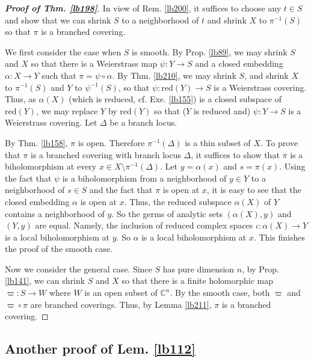 \documentclass[12pt,b5paper,notitlepage]{report}
\theoremstyle{definition}
\theoremstyle{plain}
\newcommand{\Cbb}{\mathbb C}
\newcommand{\red}{\mathrm{red}}
\numberwithin{equation}{section}
\begin{document}
\begin{proof}[\textbf{Proof of Thm. \ref{lb198}}]
In view of Rem. \ref{lb200}, it suffices to choose any $t\in S$ and show that we can shrink $S$ to a neighborhood of $t$ and shrink $X$ to $\pi^{-1}(S)$ so that $\pi$ is a branched covering. 

We first consider the case when $S$ is smooth. By Prop. \ref{lb89}, we may shrink $S$ and $X$ so that there is a Weierstrass map $\psi:Y\rightarrow S$ and a closed embedding $\alpha:X\rightarrow Y$ such that $\pi=\psi\circ\alpha$. By Thm. \ref{lb210}, we may shrink $S$, and shrink $X$ to $\pi^{-1}(S)$ and $Y$ to $\psi^{-1}(S)$, so that $\psi:\red(Y)\rightarrow S$ is a Weierstrass covering. Thus, as $\alpha(X)$ (which is reduced, cf. Exe. \ref{lb155}) is a closed subspace of $\red(Y)$, we may replace $Y$ by $\red(Y)$ so that ($Y$ is reduced and) $\psi:Y\rightarrow S$ is a Weierstrass covering. Let $\Delta$ be a branch locus.

By Thm. \ref{lb158}, $\pi$ is open. Therefore $\pi^{-1}(\Delta)$ is a thin subset of $X$. To prove that $\pi$ is a branched covering with branch locus $\Delta$, it suffices to show that $\pi$ is a biholomorphism at every $x\in X\setminus\pi^{-1}(\Delta)$. Let $y=\alpha(x)$ and $s=\pi(x)$. Using the fact that $\psi$ is a biholomorphism from a neighborhood of $y\in Y$ to a neighborhood of $s\in S$ and the fact that $\pi$ is open at $x$, it is easy to see that the closed embedding $\alpha$ is open at $x$. Thus, the reduced subspace $\alpha(X)$ of $Y$ contains a neighborhood of $y$. So the germs of analytic sets $(\alpha(X),y)$ and $(Y,y)$ are equal. Namely, the inclusion of reduced complex spaces $\iota:\alpha(X)\rightarrow Y$ is a local biholomorphism at $y$. So $\alpha$ is a local biholomorphism at $x$. This finishes the proof of the smooth case.




Now we consider the general case. Since $S$ has pure dimension $n$, by Prop. \ref{lb141}, we can shrink $S$ and $X$ so that there is a finite holomorphic map $\varpi:S\rightarrow W$ where $W$ is an open subset of $\Cbb^n$. By the smooth case, both $\varpi$ and $\varpi\circ\pi$ are branched coverings. Thus, by Lemma \ref{lb211}, $\pi$ is a branched covering. 
\end{proof}


\subsection{Another proof of Lem. \ref{lb112}}\label{lb380}
\end{document}

